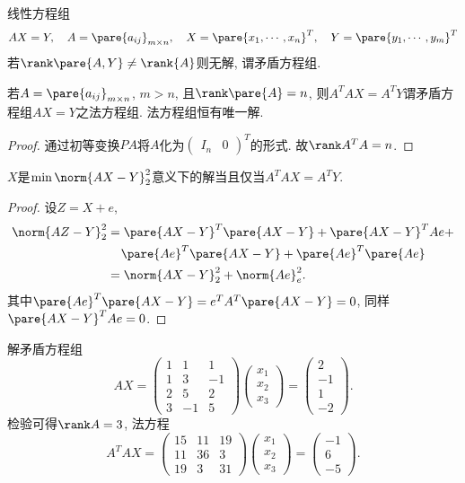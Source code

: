 \documentclass[hidelinks]{ctexart}
\begin{document}
线性方程组
\[ AX = Y,\quad A = \pare{a_{ij}}_{m\times n},\quad X = \pare{x_1,\cdots,x_n}^T,\quad Y = \pare{y_1,\cdots,y_m}^T \]
若$\rank \pare{A,Y}\neq \rank{A}$则无解, 谓矛盾方程组.
\begin{theorem}
    若$A = \pare{a_{ij}}_{m\times n}$, $m>n$, 且$\rank\pare{A} = n$, 则$A^TAX = A^TY$谓矛盾方程组$AX=Y$之法方程组. 法方程组恒有唯一解.
\end{theorem}
\begin{proof}
    通过初等变换$PA$将$A$化为$\begin{pmatrix}
        I_n & 0
    \end{pmatrix}^T$的形式. 故$\rank A^TA = n$.
\end{proof}
\begin{theorem}
    $X$是$\min \norm{AX-Y}_2^2$意义下的解当且仅当$A^TAX = A^T Y$.
\end{theorem}
\begin{proof}
    设$Z=X+e$,
    \begin{align*}
        \norm{AZ-Y}_2^2 &= \pare{AX-Y}^T\pare{AX-Y} + \pare{AX-Y}^TAe + \\
        &\phantom{=\ } \pare{Ae}^T\pare{AX-Y} + \pare{Ae}^T\pare{Ae} \\
        &= \norm{AX-Y}_2^2 + \norm{Ae}_e^2.
    \end{align*}
    其中$\pare{Ae}^T\pare{AX-Y} = e^TA^T\pare{AX-Y} = 0$, 同样$\pare{AX-Y}^TAe = 0$.
\end{proof}
\begin{ex}
    解矛盾方程组
    \[ AX = \begin{pmatrix}
        1 & 1 & 1 \\
        1 & 3 & -1 \\
        2 & 5 & 2 \\
        3 & -1 & 5
    \end{pmatrix} \begin{pmatrix}
        x_1 \\ x_2 \\ x_3
    \end{pmatrix} = \begin{pmatrix}
        2 \\ -1 \\ 1 \\ -2
    \end{pmatrix}. \]
    检验可得$\rank A = 3$, 法方程
    \[ A^TA X = \begin{pmatrix}
        15 & 11 & 19 \\
        11 & 36 & 3 \\
        19 & 3 & 31
    \end{pmatrix} \begin{pmatrix}
        x_1 \\ x_2 \\ x_3
    \end{pmatrix} = \begin{pmatrix}
        -1 \\ 6 \\ -5
    \end{pmatrix}. \]
\end{ex}
\end{document}
